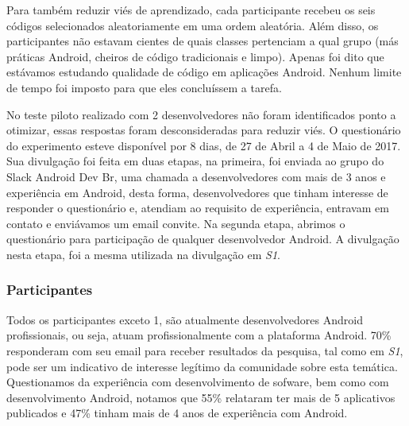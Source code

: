 Para também reduzir viés de aprendizado, cada participante recebeu os seis códigos selecionados aleatoriamente em uma ordem aleatória. Além disso, os participantes não estavam cientes de quais classes pertenciam a qual grupo (más práticas Android, cheiros de código tradicionais e limpo). Apenas foi dito que estávamos estudando qualidade de código em aplicações Android. Nenhum limite de tempo foi imposto para que eles concluíssem a tarefa.

No teste piloto realizado com 2 desenvolvedores não foram identificados ponto a otimizar, essas respostas foram desconsideradas para reduzir viés. O questionário do experimento esteve disponível por 8 dias, de 27 de Abril a 4 de Maio de 2017. Sua divulgação foi feita em duas etapas, na primeira, foi enviada ao grupo do Slack Android Dev Br, uma chamada a desenvolvedores com mais de 3 anos e experiência em Android, desta forma, desenvolvedores que tinham interesse de responder o questionário e, atendiam ao requisito de experiência, entravam em contato e enviávamos um email convite. Na segunda etapa, abrimos o questionário para participação de qualquer desenvolvedor Android. A divulgação nesta etapa, foi a mesma utilizada na divulgação em \textit{S1}. 


\subsubsection{Participantes}
\label{sub:perception-participants}
Todos os participantes exceto 1, são atualmente desenvolvedores Android profissionais, ou seja, atuam profissionalmente com a plataforma Android. 70\% responderam com seu email para receber resultados da pesquisa, tal como em \textit{S1}, pode ser um indicativo de interesse legítimo da comunidade sobre esta temática. Questionamos da experiência com desenvolvimento de sofware, bem como com desenvolvimento Android, notamos que 55\% relataram ter mais de 5 aplicativos publicados e 47\% tinham mais de 4 anos de experiência com Android. 

